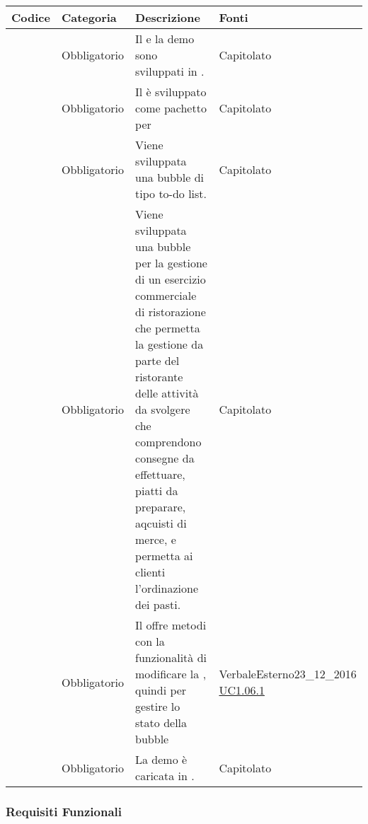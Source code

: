 \begin{longtable}{|P{1.5cm}|P{3cm}|P{6cm}|P{2.5cm}|}
	\hline \textbf{Codice} & \textbf{Categoria} & \textbf{Descrizione} & \textbf{Fonti} \\
	\hline \RequisitoObV\label{L1} & Obbligatorio & Il  e la demo sono sviluppati in . & Capitolato \\
	\hline \RequisitoObV \label{L2} & Obbligatorio & Il  è sviluppato come pachetto per  & Capitolato \\
	\hline \RequisitoObV\label{L3} & Obbligatorio & Viene sviluppata una bubble di tipo to-do list. & Capitolato \\
	\hline \RequisitoObV\label{L4} & Obbligatorio & Viene sviluppata una bubble per la gestione di un esercizio commerciale di ristorazione che permetta la gestione da parte del ristorante delle attività da svolgere che comprendono consegne da effettuare,  piatti da preparare, aqcuisti di merce, e permetta ai clienti l’ordinazione dei pasti. & Capitolato \\
	\hline \RequisitoObV\label{L5} & Obbligatorio & Il  offre metodi con la funzionalità di modificare la , quindi per gestire lo stato della bubble & VerbaleEsterno23\_12\_2016 \linebreak \hyperref[UC1.06.1]{UC1.06.1}  \\
	\hline \RequisitoObV\label{L54} & Obbligatorio & La demo è caricata in . & Capitolato \\
	\hline
\end{longtable}

\subsubsection{Requisiti Funzionali}

